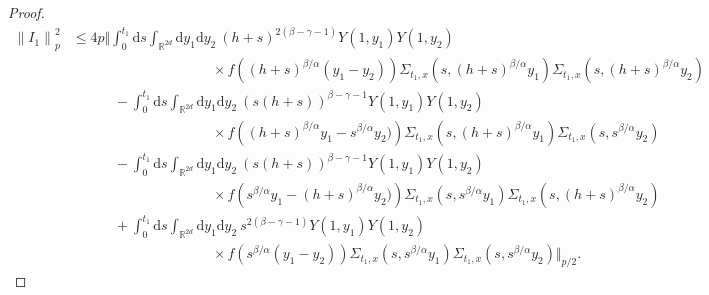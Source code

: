 \documentclass[a4paper,11pt]{article}
\numberwithin{equation}{section}
\theoremstyle{plain}
\theoremstyle{definition}
\newcommand{\ud}{\ensuremath{\mathrm{d} }}
\newcommand{\Norm}[1]{\left\|  #1   \right\|}
\newcommand{\R}{\mathbb{R}}
\numberwithin{NQ}{section}
\numberwithin{LQ}{section}
\numberwithin{ZQ}{section}
\begin{document}
\begin{proof}
\begin{align*}
    \Norm{I_1}_p^2 & \le 4p \bigg\Vert \int_0^{t_1} \ud s \int_{\R^{2d}} \ud y_1 \ud y_2 \: (h+s)^{2(\beta - \gamma - 1)} Y\left(1, y_1 \right) Y\left(1, y_2 \right)                                                      \\
                   & \hspace{10em} \times f\left((h+s)^{\beta / \alpha}(y_1 - y_2)\right) \Sigma_{t_1, x}\left(s,(h+s)^{\beta / \alpha} y_1\right)  \Sigma_{t_1, x}\left(s, (h+s)^{\beta / \alpha} y_2\right)              \\
                   & \qquad \quad - \int_0^{t_1} \ud s \int_{\R^{2d}} \ud y_1 \ud y_2 \: (s(h+s))^{\beta - \gamma - 1} Y\left(1, y_1 \right) Y\left(1, y_2 \right)                                                         \\
                   & \hspace{10em} \times f\left((h+s)^{\beta / \alpha}y_1 - s^{\beta/\alpha} y_2)\right) \Sigma_{t_1, x}\left(s,(h+s)^{\beta / \alpha} y_1\right)  \Sigma_{t_1, x}\left(s, s^{\beta / \alpha} y_2\right)  \\
                   & \qquad \quad - \int_0^{t_1} \ud s \int_{\R^{2d}} \ud y_1 \ud y_2 \: (s(h+s))^{\beta - \gamma - 1} Y\left(1, y_1 \right) Y\left(1, y_2 \right)                                                         \\
                   & \hspace{10em} \times f\left(s^{\beta / \alpha}y_1 - (h+s)^{\beta/\alpha} y_2)\right) \Sigma_{t_1, x}\left(s, s^{\beta / \alpha} y_1\right)  \Sigma_{t_1, x}\left(s, (h+s)^{\beta / \alpha} y_2\right) \\
                   & \qquad \quad + \int_0^{t_1} \ud s \int_{\R^{2d}} \ud y_1 \ud y_2 \: s^{2(\beta - \gamma - 1)} Y\left(1, y_1 \right) Y\left(1, y_2 \right)                                                             \\
                   & \hspace{10em} \times f\left(s^{\beta / \alpha}(y_1 - y_2)\right) \Sigma_{t_1, x}\left(s, s^{\beta / \alpha} y_1\right)  \Sigma_{t_1, x}\left(s, s^{\beta / \alpha} y_2\right) \bigg\Vert_{p/2}.
  \end{align*}


\end{proof}
\end{document}
